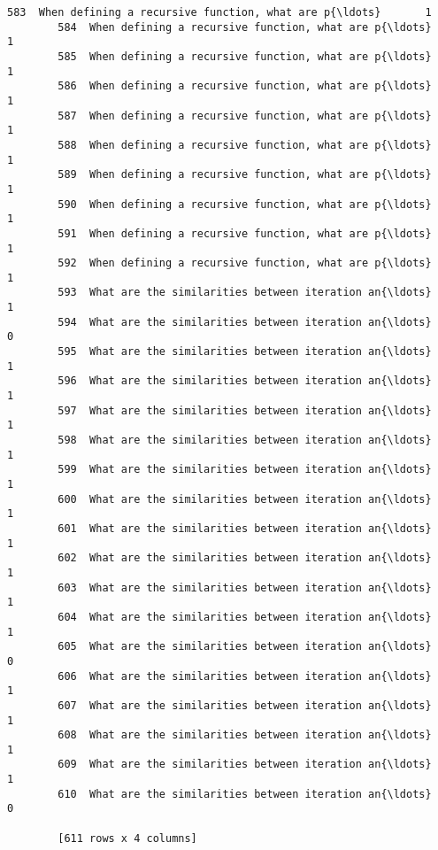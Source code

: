 \documentclass[11pt]{article}
\begin{document}
\begin{Verbatim}[commandchars=\\\{\}]
        583  When defining a recursive function, what are p{\ldots}       1  
        584  When defining a recursive function, what are p{\ldots}       1  
        585  When defining a recursive function, what are p{\ldots}       1  
        586  When defining a recursive function, what are p{\ldots}       1  
        587  When defining a recursive function, what are p{\ldots}       1  
        588  When defining a recursive function, what are p{\ldots}       1  
        589  When defining a recursive function, what are p{\ldots}       1  
        590  When defining a recursive function, what are p{\ldots}       1  
        591  When defining a recursive function, what are p{\ldots}       1  
        592  When defining a recursive function, what are p{\ldots}       1  
        593  What are the similarities between iteration an{\ldots}       1  
        594  What are the similarities between iteration an{\ldots}       0  
        595  What are the similarities between iteration an{\ldots}       1  
        596  What are the similarities between iteration an{\ldots}       1  
        597  What are the similarities between iteration an{\ldots}       1  
        598  What are the similarities between iteration an{\ldots}       1  
        599  What are the similarities between iteration an{\ldots}       1  
        600  What are the similarities between iteration an{\ldots}       1  
        601  What are the similarities between iteration an{\ldots}       1  
        602  What are the similarities between iteration an{\ldots}       1  
        603  What are the similarities between iteration an{\ldots}       1  
        604  What are the similarities between iteration an{\ldots}       1  
        605  What are the similarities between iteration an{\ldots}       0  
        606  What are the similarities between iteration an{\ldots}       1  
        607  What are the similarities between iteration an{\ldots}       1  
        608  What are the similarities between iteration an{\ldots}       1  
        609  What are the similarities between iteration an{\ldots}       1  
        610  What are the similarities between iteration an{\ldots}       0  
        
        [611 rows x 4 columns]
\end{Verbatim}
            
\end{document}
